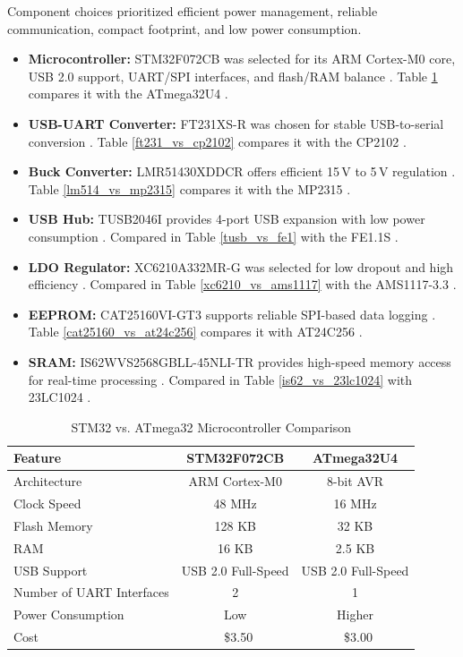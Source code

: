 \documentclass[12pt]{article}
\begin{document}
Component choices prioritized efficient power management, reliable communication, compact footprint, and low power consumption.

\begin{itemize}
    \item \textbf{Microcontroller:} STM32F072CB was selected for its ARM Cortex-M0 core, USB 2.0 support, UART/SPI interfaces, and flash/RAM balance . Table \ref{stm32_vs_atmega} compares it with the ATmega32U4 \cite{microchip2023atmega}.

    \item \textbf{USB-UART Converter:} FT231XS-R was chosen for stable USB-to-serial conversion \cite{ftdi2023ft231x}. Table \ref{ft231_vs_cp2102} compares it with the CP2102 \cite{silabs2023cp2102}.

    \item \textbf{Buck Converter:} LMR51430XDDCR offers efficient 15\,V to 5\,V regulation \cite{ti2023stepdown}. Table \ref{lm514_vs_mp2315} compares it with the MP2315 \cite{mps2023mp2315}.

    \item \textbf{USB Hub:} TUSB2046I provides 4-port USB expansion with low power consumption \cite{ti2023tusb}. Compared in Table \ref{tusb_vs_fe1} with the FE1.1S \cite{terminus2023fe11s}.

    \item \textbf{LDO Regulator:} XC6210A332MR-G was selected for low dropout and high efficiency \cite{torex2023ldo}. Compared in Table \ref{xc6210_vs_ams1117} with the AMS1117-3.3 \cite{ams2023ams1117}.

    \item \textbf{EEPROM:} CAT25160VI-GT3 supports reliable SPI-based data logging \cite{onsemi2023cat}. Table \ref{cat25160_vs_at24c256} compares it with AT24C256 \cite{microchip2023at24c256}.

    \item \textbf{SRAM:} IS62WVS2568GBLL-45NLI-TR provides high-speed memory access for real-time processing \cite{issi2023sram}. Compared in Table \ref{is62_vs_23lc1024} with 23LC1024 \cite{microchip2023sram}.
\end{itemize}
\begin{table}[H]
\centering
\begin{tabular}{|l|c|c|}
\hline
\textbf{Feature} & \textbf{STM32F072CB} & \textbf{ATmega32U4} \\
\hline
Architecture & ARM Cortex-M0 & 8-bit AVR \\
Clock Speed & 48 MHz & 16 MHz \\
Flash Memory & 128 KB & 32 KB \\
RAM & 16 KB & 2.5 KB \\
USB Support & USB 2.0 Full-Speed & USB 2.0 Full-Speed \\
Number of UART Interfaces & 2 & 1 \\
Power Consumption & Low & Higher \\
Cost & ~\$3.50 & ~\$3.00 \\
\hline
\end{tabular}
\caption{STM32 vs. ATmega32 Microcontroller Comparison}
\label{stm32_vs_atmega}
\end{table}
\end{document}
